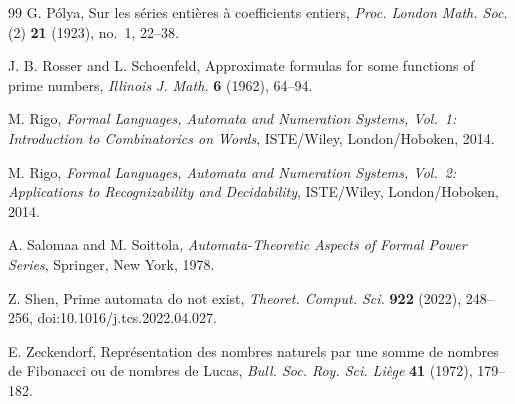 \begin{thebibliography}{99}
G. P{\'o}lya,
Sur les s{\'e}ries enti{\`e}res {\`a} coefficients entiers,
\textit{Proc. London Math. Soc.} (2) \textbf{21} (1923), no.~1, 22--38.

J. B. Rosser and L. Schoenfeld,
Approximate formulas for some functions of prime numbers,
\textit{Illinois J. Math.} \textbf{6} (1962), 64--94.

M. Rigo,
\textit{Formal Languages, Automata and Numeration Systems, Vol.~1:
Introduction to Combinatorics on Words},
ISTE/Wiley, London/Hoboken, 2014.

M. Rigo,
\textit{Formal Languages, Automata and Numeration Systems, Vol.~2:
Applications to Recognizability and Decidability},
ISTE/Wiley, London/Hoboken, 2014.

A. Salomaa and M. Soittola,
\textit{Automata-Theoretic Aspects of Formal Power Series},
Springer, New York, 1978.

Z. Shen,
Prime automata do not exist,
\textit{Theoret. Comput. Sci.} \textbf{922} (2022), 248--256,
doi:10.1016/j.tcs.2022.04.027.

E. Zeckendorf,
Repr{\'e}sentation des nombres naturels par une somme de nombres de
Fibonacci ou de nombres de Lucas,
\textit{Bull. Soc. Roy. Sci. Li{\`e}ge} \textbf{41} (1972), 179--182.

\end{thebibliography}

